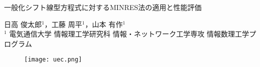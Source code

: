 
\begin{center}
	{\huge 一般化シフト線型方程式に対するMINRES法の適用と性能評価}
\end{center}
\vspace{0.5\baselineskip}
\begin{minipage}[]{0.8\columnwidth}
	\hspace{31cm} {\large 日高 俊太郎$^1$，工藤 周平$^1$，山本 有作$^1$}
	\vspace{0.2\baselineskip}\\
	\hspace{23cm} {\small $^1$ 電気通信大学 情報理工学研究科 情報・ネットワーク工学専攻 情報数理工学プログラム}
\end{minipage}
\begin{minipage}[]{0.19\columnwidth}
	\begin{figure}\centering
		\texttt{[image: uec.png]}
	\end{figure}
\end{minipage}

\vspace{\baselineskip}

